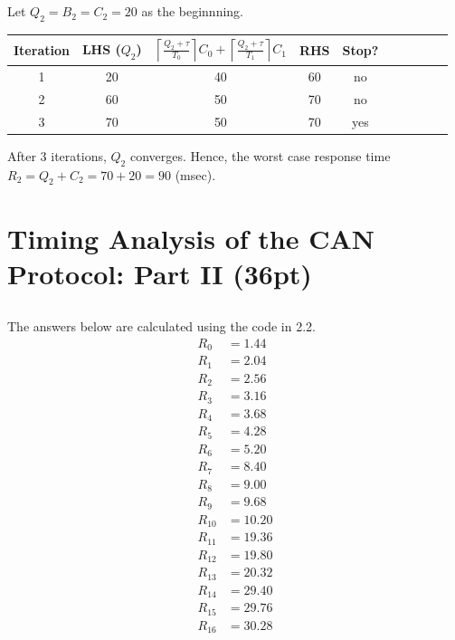 \documentclass{article}
\begin{document}
\subsection{}
Let $Q_2=B_2=C_2=20$ as the beginnning.
\begin{table}[h]
    \centering
    \renewcommand{\arraystretch}{1.5} 
    
    \begin{tabular}{|c||c||c|c|c|c|c|c|c|c|}
        \hline
        Iteration & LHS ($Q_2$) & $\left\lceil \frac{Q_2 + \tau}{T_0} \right\rceil C_0+\left\lceil \frac{Q_2+\tau}{T_1}\right\rceil C_1$ & RHS & Stop? \\ 
        \hline \hline
        1 & 20 & 40 & 60 & no \\ 
        \hline
        2 & 60 & 50  & 70 & no \\ 
        \hline
        3 & 70 & 50 & 70 & yes \\ 
        \hline
    \end{tabular}
\end{table}
After 3 iterations, $Q_2$ converges. Hence, the worst case response time $R_2=Q_2+C_2=70+20=90$ (msec).
\section{Timing Analysis of the CAN Protocol: Part II (36pt)}

\subsection{}
The answers below are calculated using the code in 2.2.
\begin{align*}
R_{0} &= 1.44 \\
R_{1} &= 2.04 \\
R_{2} &= 2.56 \\
R_{3} &= 3.16 \\
R_{4} &= 3.68 \\
R_{5} &= 4.28 \\
R_{6} &= 5.20  \\
R_{7} &= 8.40 \\
R_{8} &= 9.00 \\
R_{9} &= 9.68 \\
R_{10} &= 10.20 \\
R_{11} &= 19.36 \\
R_{12} &= 19.80 \\
R_{13} &= 20.32 \\
R_{14} &= 29.40 \\
R_{15} &= 29.76 \\
R_{16} &= 30.28
\end{align*}
\end{document}
